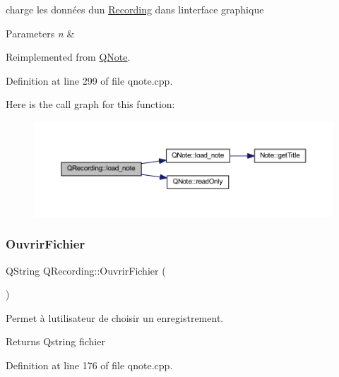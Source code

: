 charge les données d\textquotesingle{}un \hyperlink{class_recording}{Recording} dans l\textquotesingle{}interface graphique 


\begin{DoxyParams}{Parameters}
{\em n} & \\
\hline
\end{DoxyParams}


Reimplemented from \hyperlink{class_q_note_adca0a8f2851fbb1c3843ca4fe7957c11}{Q\+Note}.



Definition at line 299 of file qnote.\+cpp.

Here is the call graph for this function\+:\nopagebreak
\begin{figure}[H]
\begin{center}
\leavevmode
\includegraphics[width=350pt]{class_q_recording_aa6984351b5a0bceaa63be793b160c73b_cgraph}
\end{center}
\end{figure}
\mbox{\label{class_q_recording_a9eaf976da6c3c768d15a5e53f3982753}} 
\subsubsection{\texorpdfstring{Ouvrir\+Fichier}{OuvrirFichier}}
{\footnotesize\ttfamily Q\+String Q\+Recording\+::\+Ouvrir\+Fichier (\begin{DoxyParamCaption}{ }\end{DoxyParamCaption})\hspace{0.3cm}{\ttfamily [slot]}}



Permet à l\textquotesingle{}utilisateur de choisir un enregistrement. 

\begin{DoxyReturn}{Returns}
Qstring fichier 
\end{DoxyReturn}


Definition at line 176 of file qnote.\+cpp.

